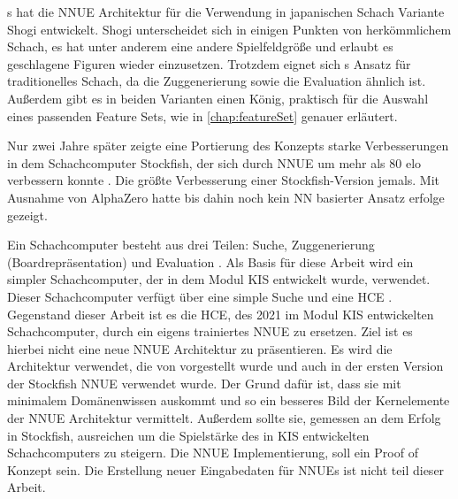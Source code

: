 \citeauthor{YNasu2018}s \cite{YNasu2018} hat die \ac{NNUE} Architektur für die Verwendung in japanischen Schach Variante Shogi entwickelt. Shogi unterscheidet sich in einigen Punkten von herkömmlichem Schach, es hat unter anderem eine andere Spielfeldgröße und erlaubt es geschlagene Figuren wieder einzusetzen. Trotzdem eignet sich \citeauthor{YNasu2018}s \cite{YNasu2018} Ansatz für traditionelles Schach, da die Zuggenerierung sowie die Evaluation ähnlich ist. Außerdem gibt es in beiden Varianten einen König, praktisch für die Auswahl eines passenden Feature Sets, wie in \autoref{chap:featureSet} genauer erläutert.

Nur zwei Jahre später zeigte eine Portierung des Konzepts starke Verbesserungen in dem Schachcomputer Stockfish, der sich durch \ac{NNUE} um mehr als 80 elo verbessern konnte \cite{StockfishIntroducingNNUE}. Die größte Verbesserung einer Stockfish-Version jemals. Mit Ausnahme von AlphaZero \cite{Silver2017} hatte bis dahin noch kein \ac{NN} basierter Ansatz erfolge gezeigt.


Ein Schachcomputer besteht aus drei Teilen: Suche, Zuggenerierung (Boardrepräsentation) und Evaluation \cite{VazquezFernandez2013}. Als Basis für diese Arbeit wird ein simpler Schachcomputer, der in dem Modul \ac{KIS} entwickelt wurde, verwendet. Dieser Schachcomputer verfügt über eine simple Suche und eine \ac{HCE} \cite{nopy}. Gegenstand dieser Arbeit ist es die \ac{HCE}, des 2021 im Modul \ac{KIS} entwickelten Schachcomputer, durch ein eigens trainiertes \ac{NNUE} zu ersetzen. Ziel ist es hierbei nicht eine neue \ac{NNUE} Architektur zu präsentieren. Es wird die Architektur verwendet, die von \citeauthor{YNasu2018} \cite{YNasu2018} vorgestellt wurde und auch in der ersten Version der Stockfish \ac{NNUE} verwendet wurde. Der Grund dafür ist, dass sie mit minimalem Domänenwissen auskommt und so ein besseres Bild der Kernelemente der \ac{NNUE} Architektur vermittelt. Außerdem sollte sie, gemessen an dem Erfolg in Stockfish, ausreichen um die Spielstärke des in \ac{KIS} entwickelten Schachcomputers zu steigern.
Die \ac{NNUE} Implementierung, soll ein Proof of Konzept sein. Die Erstellung neuer Eingabedaten für \acp{NNUE} ist nicht teil dieser Arbeit.